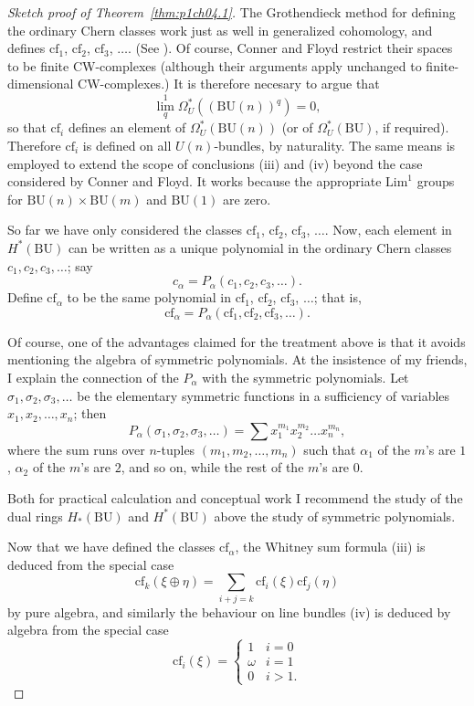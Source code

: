 \documentclass[../main]{subfiles}
\begin{document}
\begin{proof}[Sketch proof of Theorem~\ref{thm:p1ch04.1}]
The Grothendieck method for defining the ordinary Chern classes work just as well in generalized cohomology, and defines $\mathrm{cf}_1$, $\mathrm{cf}_2$, $\mathrm{cf}_3$, $\ldots$. (See ). Of course, Conner and Floyd restrict their spaces to be finite CW-complexes (although their arguments apply unchanged to finite-dimensional CW-complexes.) It is therefore necesary to argue that $$\lim_q^1 \Omega_U^\ast ((\mathrm{BU}(n))^q) = 0,$$ so that $\mathrm{cf}_i$ defines an element of $\Omega_U^\ast(\mathrm{BU}(n))$ (or of $\Omega_U^\ast(\mathrm{BU})$, if required). Therefore $\mathrm{cf}_i$ is defined on all $U(n)$-bundles, by naturality. The same means is employed to extend the scope of conclusions (iii) and (iv) beyond the case considered by Conner and Floyd. It works because the appropriate $\mathrm{Lim}^1$ groups for $\mathrm{BU}(n) \times \mathrm{BU}(m)$ and $\mathrm{BU}(1)$ are zero. 

So far we have only considered the classes $\mathrm{cf}_1$, $\mathrm{cf}_2$, $\mathrm {cf}_3$, $\ldots$. Now, each element in $H^\ast(\mathrm{BU})$ can be written as a unique polynomial in the ordinary Chern classes $c_1, c_2, c_3, \ldots$; say $$c_\alpha = P_\alpha(c_1, c_2, c_3, \ldots).$$ Define $\mathrm{cf}_\alpha$ to be the same polynomial in $\mathrm{cf}_1$, $\mathrm{cf}_2$, $\mathrm{cf}_3$, $\ldots$; that is, $$\mathrm{cf}_\alpha = P_\alpha(\mathrm{cf}_1, \mathrm{cf}_2, \mathrm{cf}_3, \ldots).$$ 

Of course, one of the advantages claimed for the treatment above is that it avoids mentioning the algebra of symmetric polynomials. At the insistence of my friends, I explain the connection of the $P_\alpha$ with the symmetric polynomials. Let $\sigma_1, \sigma_2, \sigma_3, \ldots$ be the elementary symmetric functions in a sufficiency of variables $x_1, x_2, \ldots, x_n$; then $$P_\alpha(\sigma_1, \sigma_2 ,\sigma_3, \ldots) = \sum x_1^{m_1} x_2^{m_2} \ldots x_n^{m_n},$$ where the sum runs over $n$-tuples $(m_1, m_2, \ldots, m_n)$ such that $\alpha_1$ of the $m$'s are $1$, $\alpha_2$ of the $m$'s are $2$, and so on, while the rest of the $m$'s are $0$.

Both for practical calculation and conceptual work I recommend the study of the dual rings $H_\ast(\mathrm{BU})$ and $H^\ast(\mathrm{BU})$ above the study of symmetric polynomials.

Now that we have defined the classes $\mathrm{cf}_\alpha$, the Whitney sum formula (iii) is deduced from the special case $$\mathrm{cf}_k(\xi \oplus \eta) = \sum_{i + j = k} \mathrm{cf}_i (\xi) \mathrm{cf}_j (\eta)$$ by pure algebra, and similarly the behaviour on line bundles (iv) is deduced by algebra from the special case $$\mathrm{cf}_i(\xi) = \begin{cases}1 & i = 0 \\ \omega & i = 1 \\ 0 & i > 1.\end{cases}$$
\end{proof} 
\end{document}
